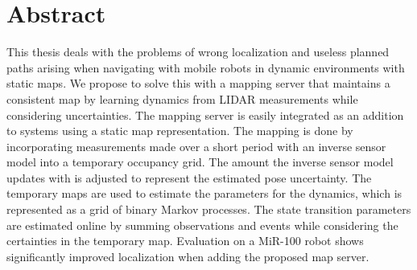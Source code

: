 \chapter*{Abstract}
This thesis deals with the problems of wrong localization and useless planned paths arising when navigating with mobile robots in dynamic environments with static maps.
We propose to solve this with a mapping server that maintains a consistent map by learning  dynamics from LIDAR measurements while considering uncertainties.
The mapping server is easily integrated as an addition to systems using a static map representation.
The mapping is done by incorporating measurements made over a short period with an inverse sensor model into a temporary occupancy grid.
The amount the inverse sensor model updates with is adjusted to represent the estimated pose uncertainty.
The temporary maps are used to estimate the parameters for the dynamics, which is represented as a grid of binary Markov processes.
The state transition parameters are estimated online by summing observations and events while considering the certainties in the temporary map.
Evaluation on a MiR-100 robot shows significantly improved localization when adding the proposed map server.